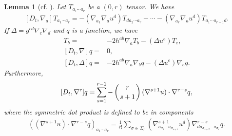 \documentclass[12pt,reqno]{amsart}
\numberwithin{equation}{section}
\newtheorem{lemma}[theorem]{Lemma}
\theoremstyle{definition}
\theoremstyle{remark}
\begin{document}
\begin{lemma}[cf. \mbox{\cite[Lemma 2.4]{CL00}}] \label{lem.CL00lem2.4}
  Let $T_{a_1\cdots a_r}$ be a $(0,r)$ tensor. We have
  \begin{align}\label{eq.CL00lem2.4.1}
    [D_t,{\nabla}_a]T_{a_1\cdots a_r}=-({\nabla}_{a_1}{\nabla}_a u^d)T_{da_2\cdots a_r}-\cdots -({\nabla}_{a_r}{\nabla}_a u^d)T_{a_1\cdots a_{r-1}d}.
  \end{align}
  If $\Delta=g^{cd}{\nabla}_c{\nabla}_d$ and $q$ is a function, we have
  \begin{align}
    [D_t,g^{ab}{\nabla}_a]T_b=&-2h^{ab}{\nabla}_a T_b-(\Delta u^e)T_e,\label{eq.CL002.4.2}\\
    [D_t,{\nabla}]q=&0, \label{eq.Dtpcommu}\\
    [D_t,\Delta]q=&-2h^{ab}{\nabla}_a{\nabla}_b q-(\Delta u^e){\nabla}_e q.\label{eq.CL002.4.3}
  \end{align}
  Furthermore,
  \begin{align}\label{eq.commutator}
    [D_t,{\nabla}^r]q=\sum_{s=1}^{r-1}-\left(r\atop s+1\right)({\nabla}^{s+1}u)\cdot {\nabla}^{r-s} q,
  \end{align}
  where the symmetric dot product is defined to be in components
  \begin{align}
    \left(({\nabla}^{s+1}u)\cdot {\nabla}^{r-s} q\right)_{a_1\cdots a_r}=\frac{1}{r!}\sum_{\sigma\in\Sigma_r}\left({\nabla}_{a_{\sigma_1}\cdots a_{\sigma_{s+1}}}^{s+1} u^d\right){\nabla}_{da_{\sigma_{s+2}}\cdots a_{\sigma_r}}^{r-s}q.
  \end{align}
\end{lemma}
\end{document}
